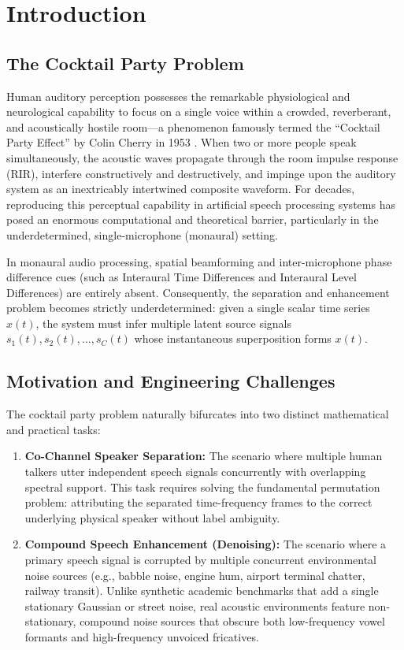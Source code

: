\documentclass[11pt,a4paper]{report}
\begin{document}
\tableofcontents
\newpage

\chapter{Introduction}
\label{chap:introduction}

\section{The Cocktail Party Problem}
Human auditory perception possesses the remarkable physiological and neurological capability to focus on a single voice within a crowded, reverberant, and acoustically hostile room---a phenomenon famously termed the ``Cocktail Party Effect'' by Colin Cherry in 1953 \cite{cherry1953some}. When two or more people speak simultaneously, the acoustic waves propagate through the room impulse response (RIR), interfere constructively and destructively, and impinge upon the auditory system as an inextricably intertwined composite waveform. For decades, reproducing this perceptual capability in artificial speech processing systems has posed an enormous computational and theoretical barrier, particularly in the underdetermined, single-microphone (monaural) setting. 

In monaural audio processing, spatial beamforming and inter-microphone phase difference cues (such as Interaural Time Differences and Interaural Level Differences) are entirely absent. Consequently, the separation and enhancement problem becomes strictly underdetermined: given a single scalar time series $x(t)$, the system must infer multiple latent source signals $s_1(t), s_2(t), \dots, s_C(t)$ whose instantaneous superposition forms $x(t)$.

\section{Motivation and Engineering Challenges}
The cocktail party problem naturally bifurcates into two distinct mathematical and practical tasks:
\begin{enumerate}
    \item \textbf{Co-Channel Speaker Separation:} The scenario where multiple human talkers utter independent speech signals concurrently with overlapping spectral support. This task requires solving the fundamental permutation problem: attributing the separated time-frequency frames to the correct underlying physical speaker without label ambiguity.
    \item \textbf{Compound Speech Enhancement (Denoising):} The scenario where a primary speech signal is corrupted by multiple concurrent environmental noise sources (e.g., babble noise, engine hum, airport terminal chatter, railway transit). Unlike synthetic academic benchmarks that add a single stationary Gaussian or street noise, real acoustic environments feature non-stationary, compound noise sources that obscure both low-frequency vowel formants and high-frequency unvoiced fricatives.
\end{enumerate}
\end{document}
